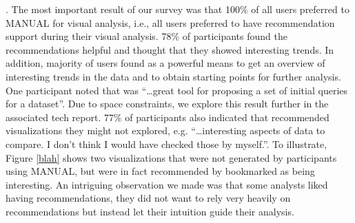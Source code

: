 




. 
The most important result of our survey was that 100\% of all users preferred \SeeDB to MANUAL for
visual analysis, i.e., all users preferred to have recommendation support during their visual analysis.
78\% of participants found the recommendations helpful and thought that they
showed interesting trends.
In addition, majority of users found \SeeDB as a powerful means to get an overview of interesting trends
in the data and to obtain starting points for further analysis. 
One participant noted that \SeeDB was ``\ldots great tool for proposing a set of initial queries for a dataset''.
Due to space constraints, we explore this result further in the associated tech report\cite{seedb-tr}.
77\% of participants also indicated that \SeeDB recommended visualizations they might not explored, e.g.
``\ldots interesting aspects of data to compare. I don't think I would have checked those by myself.''.
To illustrate, Figure \ref{blah}  shows two visualizations that were not generated by participants using MANUAL,
but were in fact recommended by  bookmarked as being interesting.
An intriguing observation we made was that some analysts liked having recommendations, they did not want to rely 
very heavily on recommendations but instead let their intuition guide their analysis.

